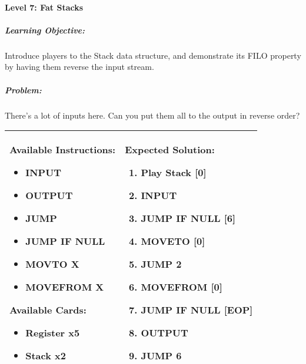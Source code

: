 \paragraph{Level 7: Fat Stacks}
\subparagraph{Learning Objective:} Introduce players to the Stack data structure, and demonstrate its FILO property by having them reverse the input stream.

\subparagraph{Problem:} There's a lot of inputs here. Can you put them all to the output in reverse order?

\begin{center}
    \begin{tabular}{ | m{5cm} | m{9cm} | } 
        \hline
            \textbf{Available Instructions:} 
            \begin{itemize}
                \setlength\itemsep{-.35em}
                \item INPUT
                \item OUTPUT
                \item JUMP
                \item JUMP IF NULL
                \item MOVTO X
                \item MOVEFROM X
            \end{itemize}
            \textbf{Available Cards:} 
            \begin{itemize}
                \setlength\itemsep{-.35em}
                \item Register x5
                \item Stack x2
            \end{itemize}& 
            \textbf{Expected Solution:} 
            \begin{enumerate}
                \setlength\itemsep{-.35em}
                \item Play Stack [0]
                \item INPUT
                \item JUMP IF NULL [6]
                \item MOVETO [0]
                \item JUMP 2
                \item MOVEFROM [0]
                \item JUMP IF NULL [EOP]
                \item OUTPUT
                \item JUMP 6
            \end{enumerate}
            \\
        \hline
    \end{tabular}
\end{center}


